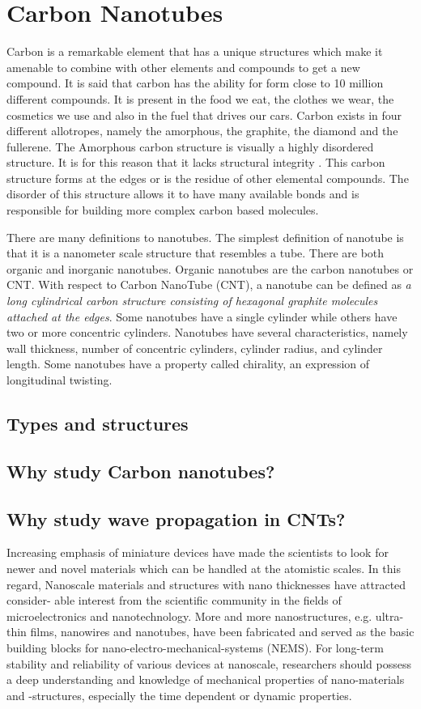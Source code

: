 \section {Carbon Nanotubes}
Carbon is a remarkable element that has a unique structures which make it amenable
to combine with other elements and compounds to get a new compound. It is said
that carbon has the ability for form close to 10 million different compounds. It is
present in the food we eat, the clothes we wear, the cosmetics we use and also in
the fuel that drives our cars. Carbon exists in four different allotropes, namely the
amorphous, the graphite, the diamond and the fullerene. The Amorphous carbon
structure is visually a highly disordered structure. It is for this reason that it lacks
structural integrity . This carbon structure forms at the edges or is the residue of other
elemental compounds. The disorder of this structure allows it to have many available
bonds and is responsible for building more complex carbon based molecules.

There are many definitions to nanotubes. The simplest definition of nanotube is that
it is a nanometer scale structure that resembles a tube. There are both organic and
inorganic nanotubes. Organic nanotubes are the carbon nanotubes or CNT. With
respect to Carbon NanoTube (CNT), a nanotube can be defined as \emph{a long cylindrical carbon structure
consisting of hexagonal graphite molecules attached at the edges}. Some nanotubes
have a single cylinder while others have two or more concentric cylinders. Nanotubes
have several characteristics, namely wall thickness, number of concentric cylinders,
cylinder radius, and cylinder length. Some nanotubes have a property called chirality,
an expression of longitudinal twisting.

\subsection {Types and structures}
\subsection {Why study Carbon nanotubes?}
\subsection {Why study wave propagation in CNTs?}
Increasing emphasis of miniature devices have made the scientists to look for newer
and novel materials which can be handled at the atomistic scales. In this regard,
Nanoscale materials and structures with nano thicknesses have attracted consider-
able interest from the scientific community in the fields of microelectronics and
nanotechnology. More and more nanostructures, e.g. ultra-thin films, nanowires
and nanotubes, have been fabricated and served as the basic building blocks for
nano-electro-mechanical-systems (NEMS). For long-term stability and reliability of
various devices at nanoscale, researchers should possess a deep understanding and
knowledge of mechanical properties of nano-materials and -structures, especially the
time dependent or dynamic properties.

